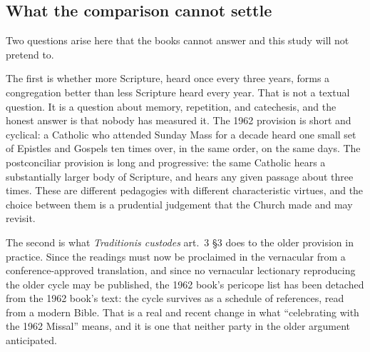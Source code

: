\subsection{What the comparison cannot settle}

Two questions arise here that the books cannot answer and this study will not pretend to.

The first is whether more Scripture, heard once every three years, forms a congregation better than less Scripture heard every year. That is not a textual question. It is a question about memory, repetition, and catechesis, and the honest answer is that nobody has measured it. The 1962 provision is short and cyclical: a Catholic who attended Sunday Mass for a decade heard one small set of Epistles and Gospels ten times over, in the same order, on the same days. The postconciliar provision is long and progressive: the same Catholic hears a substantially larger body of Scripture, and hears any given passage about three times. These are different pedagogies with different characteristic virtues, and the choice between them is a prudential judgement that the Church made and may revisit.

The second is what \emph{Traditionis custodes} art.~3 \S 3 does to the older provision in practice. Since the readings must now be proclaimed in the vernacular from a conference-approved translation, and since no vernacular lectionary reproducing the older cycle may be published, the 1962 book's pericope list has been detached from the 1962 book's text: the cycle survives as a schedule of references, read from a modern Bible. That is a real and recent change in what ``celebrating with the 1962 Missal'' means, and it is one that neither party in the older argument anticipated.
